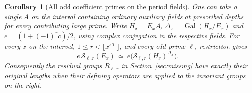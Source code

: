 \documentclass[a4paper,11pt]{article}
\newtheorem{corollary}[proposition]{Corollary}
\theoremstyle{definition}
\theoremstyle{remark}
\numberwithin{equation}{section}
\begin{document}
\begin{corollary}[All odd coefficient primes on the period fields]\leavevmode
\label{cor:intervalbase416}
One can take a single \(A\) on the interval containing ordinary
auxiliary fields at prescribed depths for every contributing
large prime. Write \(H_x=E_xA\), \(\Delta_x=\operatorname{Gal}
(H_x/E_x)\) and \(e=(1+(-1)^rc)/2\), using complex conjugation
in the respective fields. For every \(x\) on the interval,
\(1\le r<\lfloor x^{401}\rfloor\), and every odd prime \(\ell\),
restriction gives
\[
       e\,\mathcal S_{\ell,r}(E_x)
          \ \simeq\ e\big(\mathcal S_{\ell,r}(H_x)^{\Delta_x}\big).
\]
Consequently the residual groups \(R_{\ell,r}\) in
Section~\ref{sec:missing} have exactly their original lengths
when their defining operators are applied to the invariant
groups on the right.
\end{corollary}
\end{document}
